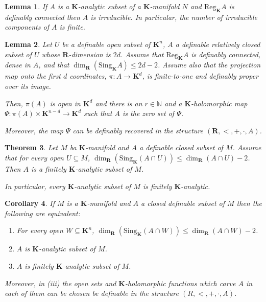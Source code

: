 \documentclass{amsart}
\newtheorem{theorem}{Theorem}[subsection]
\newtheorem{lemma}[theorem]{Lemma}
\newtheorem{corollary}[theorem]{Corollary}
\theoremstyle{definition}
\numberwithin{equation}{section}
\begin{document}
\begin{lemma}
  If $A$ is a $\mathbf{K}$-analytic subset of a $\mathbf{K}$-manifold $N$ and $\mathrm{Reg}_{\mathbf{K}}A$ is definably connected then $A$ is irreducible.
  In particular, the number of irreducible components of $A$ is finite.
\end{lemma}

\begin{lemma}
  Let $U$ be a definable open subset of $\mathbf{K}^n$,
  $A$ a definable relatively closed subset of $U$
  whose $\mathbf{R}$-dimension is $2d$.
  Assume that $\mathrm{Reg}_{\mathbf{K}}A$ is definably connected,
  dense in $A$, and that $\dim_{\mathbf{R}}(\mathrm{Sing}_{\mathbf{K}}A) \le 2d-2$.
  Assume also that the projection map onto the first $d$ coordinates,
  $\pi : A \to \mathbf{K}^d$,
  is finite-to-one and definably proper over its image.

  Then, $\pi(A)$ is open in $\mathbf{K}^d$ and there is an $r\in \mathbb{N}$ and a $\mathbf{K}$-holomorphic map
  $\Psi: \pi(A) \times \mathbf{K}^{n-d} \to \mathbf{K}^d$ such that $A$ is the zero set of $\Psi$.

  Moreover, the map $\Psi$ can be definably recovered in the structure $(\mathbf{R},<,+,\cdot,A)$.
\end{lemma}

\begin{tcolorbox}
\begin{theorem}
  Let $M$ ba $\mathbf{K}$-manifold and $A$ a definable closed subset of $M$.
  Assume that for every open $U \subseteq M$,
  $\dim_{\mathbf{R}}(\mathrm{Sing}_{\mathbf{K}}(A\cap U)) \le \dim_{\mathbf{R}}(A\cap U) -2$.
  Then $A$ is a finitely $\mathbf{K}$-analytic subset of $M$.

  In particular, every $\mathbf{K}$-analytic subset of $M$ is finitely $\mathbf{K}$-analytic.
\end{theorem}
\end{tcolorbox}

\begin{corollary}
If $M$ is a $\mathbf{K}$-manifold and $A$ a closed definable subset of $M$ then the following are equivalent:
\begin{enumerate}[label = (\roman*)]
  \item For every open $W \subseteq \mathbf{K}^n$, $\dim_{\mathbf{R}}(\mathrm{Sing}_{\mathbf{K}}(A\cap W)) \le \dim_{\mathbf{R}}(A\cap W) -2$.
  \item $A$ is $\mathbf{K}$-analytic subset of $M$.
  \item $A$ is finitely $\mathbf{K}$-analytic subset of $M$.
\end{enumerate}
Moreover, in (iii) the open sets and $\mathbf{K}$-holomorphic functions which carve $A$ in each of them can be chosen be definable in the structure $(R,<,+,\cdot,A)$.
\end{corollary}
\end{document}
